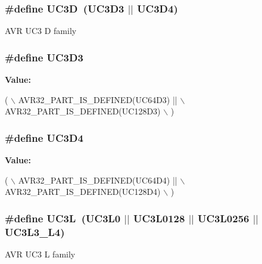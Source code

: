 \subsubsection[{U\+C3\+D}]{\setlength{\rightskip}{0pt plus 5cm}\#define U\+C3\+D~(U\+C3\+D3 $\vert$$\vert$ U\+C3\+D4)}\label{group__uc3__part__macros__group_ga351a876f40669641e6ba9620909143d3}
A\+V\+R U\+C3 D family \hypertarget{group__uc3__part__macros__group_ga432af70c4d53fc917770e4ce48440613}{}
\subsubsection[{U\+C3\+D3}]{\setlength{\rightskip}{0pt plus 5cm}\#define U\+C3\+D3}\label{group__uc3__part__macros__group_ga432af70c4d53fc917770e4ce48440613}
{\bfseries Value\+:}
\begin{DoxyCode}
(   \(\backslash\)
        AVR32\_PART\_IS\_DEFINED(UC64D3)  || \(\backslash\)
        AVR32\_PART\_IS\_DEFINED(UC128D3) \(\backslash\)
        )
\end{DoxyCode}
\hypertarget{group__uc3__part__macros__group_gae271cf5f4b9459baea7216c071e02d76}{}
\subsubsection[{U\+C3\+D4}]{\setlength{\rightskip}{0pt plus 5cm}\#define U\+C3\+D4}\label{group__uc3__part__macros__group_gae271cf5f4b9459baea7216c071e02d76}
{\bfseries Value\+:}
\begin{DoxyCode}
(   \(\backslash\)
        AVR32\_PART\_IS\_DEFINED(UC64D4)  || \(\backslash\)
        AVR32\_PART\_IS\_DEFINED(UC128D4) \(\backslash\)
        )
\end{DoxyCode}
\hypertarget{group__uc3__part__macros__group_gac8a7d715e500aa74cd05e0f0fc5bb005}{}
\subsubsection[{U\+C3\+L}]{\setlength{\rightskip}{0pt plus 5cm}\#define U\+C3\+L~(U\+C3\+L0 $\vert$$\vert$ U\+C3\+L0128 $\vert$$\vert$ U\+C3\+L0256 $\vert$$\vert$ U\+C3\+L3\+\_\+\+L4)}\label{group__uc3__part__macros__group_gac8a7d715e500aa74cd05e0f0fc5bb005}
A\+V\+R U\+C3 L family \hypertarget{group__uc3__part__macros__group_ga4a399e061cd2bf1088c01a22f69cf6c1}{}
